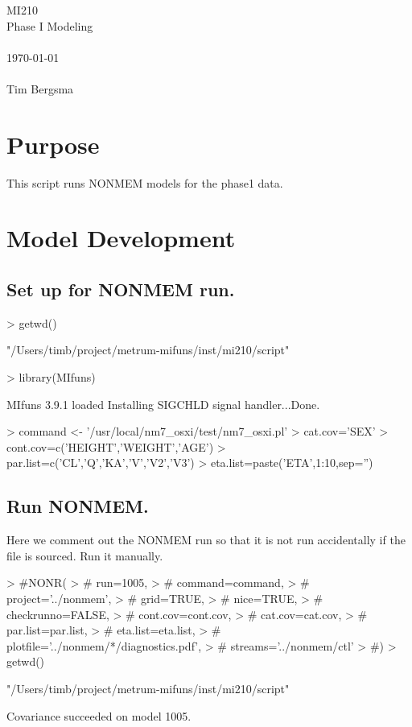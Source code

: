 
\usepackage{Sweave}

 

\vspace*{2cm}
\begin{center}
{\Huge MI210}\\
\vspace{1.5cm}
{\Large Phase I Modeling}\\
~\\
\today\\
~\\
Tim Bergsma\\
\end{center}
\newpage

\section{Purpose}
This script runs NONMEM models for the phase1 data.
\section{Model Development}
\subsection{Set up for NONMEM run.}
\begin{Schunk}
\begin{Sinput}
> getwd()
\end{Sinput}
\begin{Soutput}
[1] "/Users/timb/project/metrum-mifuns/inst/mi210/script"
\end{Soutput}
\begin{Sinput}
> library(MIfuns)
\end{Sinput}
\begin{Soutput}
MIfuns 3.9.1 loaded
Installing SIGCHLD signal handler...Done.
\end{Soutput}
\begin{Sinput}
> command <- '/usr/local/nm7_osxi/test/nm7_osxi.pl'
> cat.cov='SEX'
> cont.cov=c('HEIGHT','WEIGHT','AGE')
> par.list=c('CL','Q','KA','V','V2','V3')
> eta.list=paste('ETA',1:10,sep='')
\end{Sinput}
\end{Schunk}
\subsection{Run NONMEM.}
Here we comment out the NONMEM run so that it is not run accidentally 
if the file is sourced.  Run it manually.
\begin{Schunk}
\begin{Sinput}
> #NONR(
> #     run=1005,
> #     command=command,
> #     project='../nonmem',
> #     grid=TRUE,
> #     nice=TRUE,
> #     checkrunno=FALSE,
> #     cont.cov=cont.cov,
> #     cat.cov=cat.cov,
> #     par.list=par.list,
> #     eta.list=eta.list,
> #     plotfile='../nonmem/*/diagnostics.pdf',
> #     streams='../nonmem/ctl'
> #)
> getwd()
\end{Sinput}
\begin{Soutput}
[1] "/Users/timb/project/metrum-mifuns/inst/mi210/script"
\end{Soutput}
\end{Schunk}
Covariance succeeded on model 1005.
